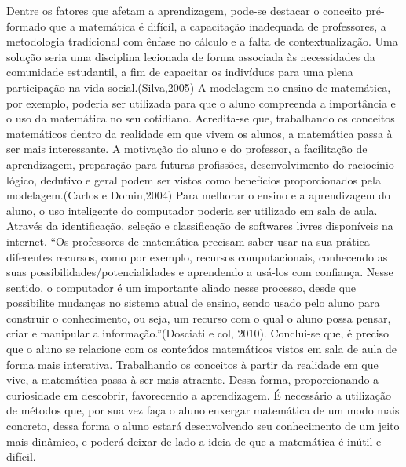 \documentclass[12pt,a4paper]{article}
\begin{document}
Dentre os fatores que afetam a aprendizagem, pode-se destacar o conceito pré-formado que a matemática é difícil, a capacitação inadequada de professores, a metodologia tradicional com ênfase no cálculo e a falta de contextualização. Uma solução seria uma disciplina lecionada de forma associada às necessidades da comunidade estudantil, a fim de capacitar os indivíduos para uma plena participação na vida social.(Silva,2005) 
A modelagem no ensino de matemática, por exemplo, poderia ser utilizada para que o aluno compreenda a importância e o uso da matemática no seu cotidiano. Acredita-se que, trabalhando os conceitos matemáticos dentro da realidade em que vivem os alunos, a matemática passa à ser mais interessante. A motivação do aluno e do professor, a facilitação de aprendizagem, preparação para futuras profissões, desenvolvimento do raciocínio lógico, dedutivo e geral podem ser vistos como benefícios proporcionados pela modelagem.(Carlos e Domin,2004)
Para melhorar o ensino e a aprendizagem do aluno, o uso inteligente do computador poderia ser utilizado em sala de aula. Através da identificação, seleção e classificação de softwares livres disponíveis na internet.
“Os professores de matemática precisam saber usar na sua prática  diferentes  recursos, como por exemplo, recursos computacionais, conhecendo as suas  possibilidades/potencialidades e aprendendo a usá-los com confiança. Nesse sentido, o computador é um importante aliado nesse processo, desde que possibilite mudanças no sistema atual de ensino, sendo usado pelo aluno para construir o conhecimento, ou seja, um recurso com o qual o aluno possa pensar, criar e manipular a informação.”(Dosciati e col, 2010).
Conclui-se que, é preciso que o aluno se relacione com os conteúdos matemáticos vistos em sala de aula de forma mais interativa. Trabalhando os conceitos à partir da realidade em que vive, a matemática passa à ser mais atraente. Dessa forma, proporcionando a curiosidade em descobrir, favorecendo a aprendizagem. É necessário a utilização de métodos que, por sua vez faça o aluno enxergar matemática de um modo mais concreto, dessa forma o aluno estará desenvolvendo seu conhecimento   de um jeito mais dinâmico, e poderá deixar de lado a ideia de que a matemática é inútil e difícil.
\end{document}
